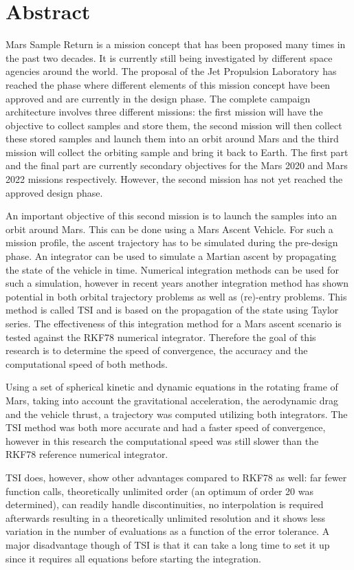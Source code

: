 \chapter{Abstract}
\label{ch:Abstract}
Mars Sample Return is a mission concept that has been proposed many times in the past two decades. It is currently still being investigated by different space agencies around the world. The proposal of the Jet Propulsion Laboratory has reached the phase where different elements of this mission concept have been approved and are currently in the design phase. The complete campaign architecture involves three different missions: the first mission will have the objective to collect samples and store them, the second mission will then collect these stored samples and launch them into an orbit around Mars and the third mission will collect the orbiting sample and bring it back to Earth. The first part and the final part are currently secondary objectives for the Mars 2020 and Mars 2022 missions respectively. However, the second mission has not yet reached the approved design phase. 

An important objective of this second mission is to launch the samples into an orbit around Mars. This can be done using a Mars Ascent Vehicle. For such a mission profile, the ascent trajectory has to be simulated during the pre-design phase. An integrator can be used to simulate a Martian ascent by propagating the state of the vehicle in time. Numerical integration methods can be used for such a simulation, however in recent years another integration method has shown potential in both orbital trajectory problems as well as (re)-entry problems. This method is called \acf{TSI} and is based on the propagation of the state using Taylor series. The effectiveness of this integration method for a Mars ascent scenario is tested against the \acf{RKF78} numerical integrator. Therefore the goal of this research is to determine the speed of convergence, the accuracy and the computational speed of both methods. 

Using a set of spherical kinetic and dynamic equations in the rotating frame of Mars, taking into account the gravitational acceleration, the aerodynamic drag and the vehicle thrust, a trajectory was computed utilizing both integrators. The \ac{TSI} method was both more accurate and had a faster speed of convergence, however in this research the computational speed was still slower than the \ac{RKF78} reference numerical integrator. 

\ac{TSI} does, however, show other advantages compared to \ac{RKF78} as well: far fewer function calls, theoretically unlimited order (an optimum of order 20 was determined), can readily handle discontinuities, no interpolation is required afterwards resulting in a theoretically unlimited resolution and it shows less variation in the number of evaluations as a function of the error tolerance. A major disadvantage though of \ac{TSI} is that it can take a long time to set it up since it requires all equations before starting the integration.

